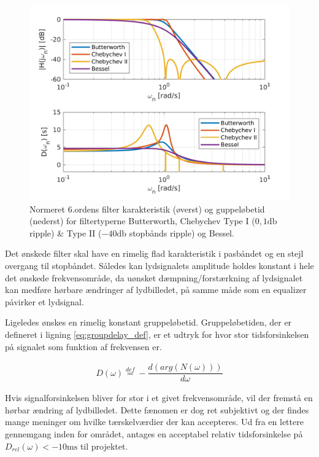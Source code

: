 \begin{figure}[h!]
	\centering
	\includegraphics[width=1\textwidth]{matlab/filter_compare.png}
	\caption{Normeret 6.ordens filter karakteristik (øverst) og guppeløbetid (nederst) for filtertyperne Butterworth, Chebychev Type I ($0,1 \si{\decibel}$ ripple) \& Type II ($-40 \si{\decibel}$ stopbånds ripple) og Bessel.}
	\label{fig:filter_typer}
\end{figure}

Det ønskede filter skal have en rimelig flad karakteristik i pasbåndet og en stejl overgang til stopbåndet.
Således kan lydsignalets amplitude holdes konstant i hele det ønskede frekvensområde, da uønsket dæmpning/forstærkning af lydsignalet kan medføre hørbare ændringer af lydbilledet, på samme måde som en equalizer påvirker et lydsignal. 

Ligeledes ønskes en rimelig konstant gruppeløbetid. 
Gruppeløbetiden, der er defineret i ligning \ref{eq:groupdelay_def}\cite{anfilter}, er et udtryk for hvor stor tidsforsinkelsen på signalet som funktion af frekvensen er.

\begin{align}
	D(\omega) \stackrel{def}{=} - \dfrac{d(arg(N(\omega)))}{d\omega}\label{eq:groupdelay_def}
\end{align}

Hvis signalforsinkelsen bliver for stor i et givet frekvensområde, vil der fremstå en hørbar ændring af lydbilledet.
Dette fænomen er dog ret subjektivt og der findes mange meninger om hvilke tærskelværdier der kan accepteres.
Ud fra en lettere gennemgang inden for området, antages en acceptabel relativ tidsforsinkelse på $D_{rel}(\omega) < -10 \si{\milli\second}$ til projektet.   

